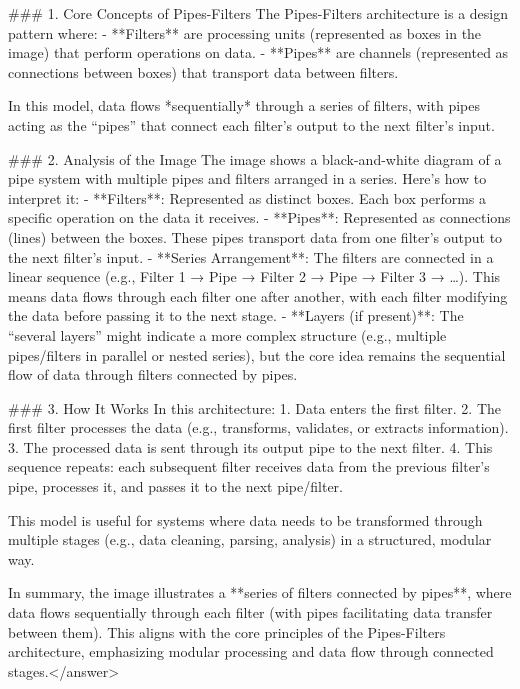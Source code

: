 ### 1. Core Concepts of Pipes-Filters  
The Pipes-Filters architecture is a design pattern where:  
- **Filters** are processing units (represented as boxes in the image) that perform operations on data.  
- **Pipes** are channels (represented as connections between boxes) that transport data between filters.  

In this model, data flows *sequentially* through a series of filters, with pipes acting as the “pipes” that connect each filter’s output to the next filter’s input.  


### 2. Analysis of the Image  
The image shows a black-and-white diagram of a pipe system with multiple pipes and filters arranged in a series. Here’s how to interpret it:  
- **Filters**: Represented as distinct boxes. Each box performs a specific operation on the data it receives.  
- **Pipes**: Represented as connections (lines) between the boxes. These pipes transport data from one filter’s output to the next filter’s input.  
- **Series Arrangement**: The filters are connected in a linear sequence (e.g., Filter 1 → Pipe → Filter 2 → Pipe → Filter 3 → …). This means data flows through each filter one after another, with each filter modifying the data before passing it to the next stage.  
- **Layers (if present)**: The “several layers” might indicate a more complex structure (e.g., multiple pipes/filters in parallel or nested series), but the core idea remains the sequential flow of data through filters connected by pipes.  


### 3. How It Works  
In this architecture:  
1. Data enters the first filter.  
2. The first filter processes the data (e.g., transforms, validates, or extracts information).  
3. The processed data is sent through its output pipe to the next filter.  
4. This sequence repeats: each subsequent filter receives data from the previous filter’s pipe, processes it, and passes it to the next pipe/filter.  

This model is useful for systems where data needs to be transformed through multiple stages (e.g., data cleaning, parsing, analysis) in a structured, modular way.  


In summary, the image illustrates a **series of filters connected by pipes**, where data flows sequentially through each filter (with pipes facilitating data transfer between them). This aligns with the core principles of the Pipes-Filters architecture, emphasizing modular processing and data flow through connected stages.</answer>